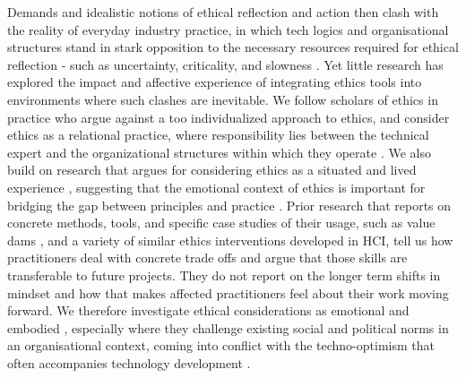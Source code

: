 Demands and idealistic notions of ethical reflection and action then clash with the reality of everyday industry practice, in which tech logics and organisational structures stand in stark opposition to the necessary resources required for ethical reflection - such as uncertainty, criticality, and slowness \cite{stark2009creative}. Yet little research has explored the impact and affective experience of integrating ethics tools into environments where such clashes are inevitable. We follow scholars of ethics in practice \cite{drage2024engineers, powell2022addressing, raji2021you, shklovski2023nodes} who argue against a too individualized approach to ethics, and consider ethics as a relational practice, where responsibility lies between the technical expert and the organizational structures within which they operate \cite{kranakis2004fixing}. We also build on research that argues for considering ethics as a situated and lived experience \cite{shilton2018engaging}, suggesting that the emotional context of ethics is important for bridging the gap between principles and practice \cite{dunbar2005emotional}. Prior research that reports on concrete methods, tools, and specific case studies of their usage, such as value dams \cite{Miller2007ValueDams}, and a variety of similar ethics interventions developed in HCI, tell us how practitioners deal with concrete trade offs and argue that those skills are transferable to future projects. They do not report on the longer term shifts in mindset and how that makes affected practitioners feel about their work moving forward. We therefore investigate ethical considerations as emotional and embodied \cite{su2021critical}, especially where they challenge existing social and political norms in an organisational context, coming into conflict with the techno-optimism that often accompanies technology development \cite{gould2009moving}.


